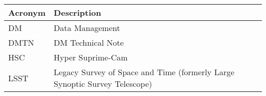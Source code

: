 \addtocounter{table}{-1}
\begin{longtable}{p{}p{}}\hline
\textbf{Acronym} & \textbf{Description}  \\\hline

DM & Data Management \\\hline
DMTN & DM Technical Note \\\hline
HSC & Hyper Suprime-Cam \\\hline
LSST & Legacy Survey of Space and Time (formerly Large Synoptic Survey Telescope) \\\hline
\end{longtable}
